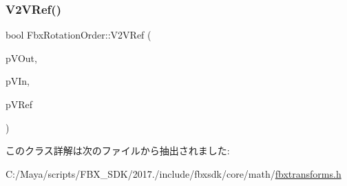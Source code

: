 \subsubsection{\texorpdfstring{V2\+V\+Ref()}{V2VRef()}}
{\footnotesize\ttfamily bool Fbx\+Rotation\+Order\+::\+V2\+V\+Ref (\begin{DoxyParamCaption}\item[{\hyperlink{class_fbx_vector4}{Fbx\+Vector4} \&}]{p\+V\+Out,  }\item[{const \hyperlink{class_fbx_vector4}{Fbx\+Vector4} \&}]{p\+V\+In,  }\item[{const \hyperlink{class_fbx_vector4}{Fbx\+Vector4} \&}]{p\+V\+Ref }\end{DoxyParamCaption})}



このクラス詳解は次のファイルから抽出されました\+:\begin{DoxyCompactItemize}
\item 
C\+:/\+Maya/scripts/\+F\+B\+X\+\_\+\+S\+D\+K/2017./include/fbxsdk/core/math/\hyperlink{fbxtransforms_8h}{fbxtransforms.\+h}\end{DoxyCompactItemize}
